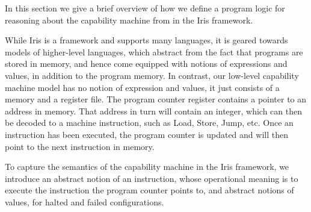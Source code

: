 \documentclass[sigplan,review]{acmart}\settopmatter{printfolios=true,printccs=false,printacmref=false}
\begin{document}

In this section we give a brief overview of how we define a program logic
for reasoning about the capability machine from \cite{skorstengaardESOP18} in the Iris framework.

While Iris is a framework and supports many languages, it is geared towards models of higher-level languages, which abstract from the fact that programs are stored in memory, and hence come equipped with notions of expressions and values, in addition to the program memory.
In contrast, our low-level capability machine model has no notion of expression and values, it just consists of a memory and a register file.
The program counter register contains a pointer to an address in memory.
That address in turn will contain an integer, which can then be decoded to a machine instruction, such as Load, Store, Jump, etc.
Once an instruction has been executed, the program counter is updated and will then point to the next instruction in memory.

To capture the semantics of the capability machine in the Iris framework, we introduce an abstract notion of an instruction, whose operational meaning is to execute the instruction the program counter points to, and abstract notions of values, for halted and failed configurations.
\end{document}
